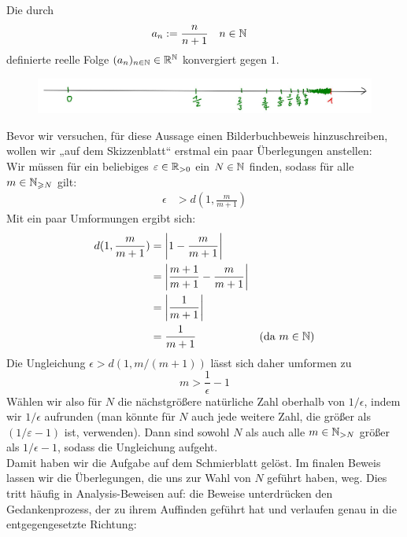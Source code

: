 \begin{bsp}
 Die durch
 \begin{align*}
  a_n &:= \frac{n}{n+1} && n\in {\mathbb N}
 \end{align*}
 definierte reelle Folge $(a_n)_{n\in {\mathbb N}}\in {\mathbb R}^{\mathbb N}$ konvergiert gegen $1$.
\end{bsp}
     \begin{figure}[H]
\begin{center}
\includegraphics[width=14cm]{./_img/Konvergenzbsp.jpeg}
\end{center}
\end{figure}
\begin{bem}
Bevor wir versuchen, für diese Aussage einen Bilderbuchbeweis hinzuschreiben, wollen wir „auf dem Skizzenblatt“ erstmal ein paar Überlegungen anstellen: \\
 Wir müssen für ein beliebiges $\varepsilon \in {\mathbb R}_{>0}$ ein $N\in {\mathbb N}$ finden, sodass für alle $m\in {\mathbb N}_{\geqslant N}$ gilt:
 \begin{align*}
   \epsilon &  > d(1,\frac{m}{m+1})
   \end{align*}
   Mit ein paar Umformungen ergibt sich:
   \begin{align*}
  d(1,\frac{m}{m+1}) & = \left| 1-\frac{m}{m+1}\right| \\
   & = \left| \frac{m+1}{m+1} - \frac{m}{m+1} \right| \\
   & = \left| \frac{1}{m+1}\right| \\
   & = \frac{1}{m+1} & (\text{da $m\in {\mathbb N}$})
 \end{align*}
Die Ungleichung $\epsilon >d(1,m/(m+1))$ lässt sich daher umformen zu
\[ m > \frac{1}{\epsilon} -1  \]
Wählen wir also für $N$ die nächstgrößere natürliche Zahl oberhalb von $1/\epsilon$, indem wir $1/\epsilon$ aufrunden (man könnte für $N$ auch jede weitere Zahl, die größer als $(1/\varepsilon -1)$ ist, verwenden). Dann sind sowohl $N$ als auch alle $m\in {\mathbb N}_{>N}$ größer als $1/\epsilon- 1$, sodass die Ungleichung aufgeht. \\[0.5em]
Damit haben wir die Aufgabe auf dem Schmierblatt gelöst. Im finalen Beweis lassen wir die Überlegungen, die uns zur Wahl von $N$ geführt haben, weg. Dies tritt häufig in Analysis-Beweisen auf: die Beweise unterdrücken den Gedankenprozess, der zu ihrem Auffinden geführt hat und verlaufen genau in die entgegengesetzte Richtung:
\end{bem}
